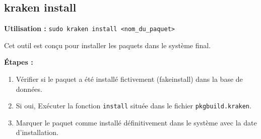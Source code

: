 









\subsection{kraken install}

\textbf{Utilisation :} \texttt{sudo kraken install <nom\_du\_paquet>}

Cet outil est conçu pour installer les paquets dans le système final.

\textbf{Étapes :}
\begin{enumerate}
  \item Vérifier si le paquet a été installé fictivement (fakeinstall) dans la base de données.
  \item Si oui, Exécuter la fonction \texttt{install} située dans le fichier \texttt{pkgbuild.kraken}.
  \item Marquer le paquet comme installé définitivement dans le système avec la date d’installation.
\end{enumerate}



